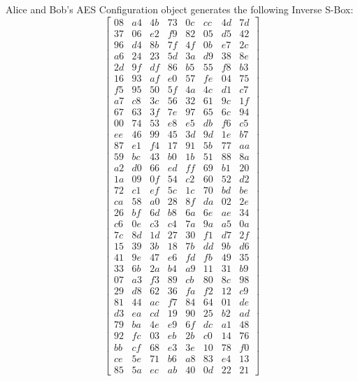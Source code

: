 \documentclass[journal]{IEEEtran}
\begin{document}
Alice and Bob's AES Configuration object generates the following Inverse S-Box:
$$
\begin{bmatrix} 
08 & a4 & 4b & 73 & 0c & cc & 4d & 7d \\
37 & 06 & e2 & f9 & 82 & 05 & d5 & 42 \\
96 & d4 & 8b & 7f & 4f & 0b & e7 & 2c \\
a6 & 24 & 23 & 5d & 3a & d9 & 38 & 8e \\
2d & 9f & df & 86 & b5 & 55 & f8 & b3 \\
16 & 93 & af & e0 & 57 & fe & 04 & 75 \\
f5 & 95 & 50 & 5f & 4a & 4c & d1 & c7 \\
a7 & c8 & 3c & 56 & 32 & 61 & 9c & 1f \\
67 & 63 & 3f & 7e & 97 & 65 & 6c & 94 \\
00 & 74 & 53 & e8 & e5 & db & f6 & c5 \\
ee & 46 & 99 & 45 & 3d & 9d & 1e & b7 \\
87 & e1 & f4 & 17 & 91 & 5b & 77 & aa \\
59 & bc & 43 & b0 & 1b & 51 & 88 & 8a \\
a2 & d0 & 66 & ed & ff & 69 & b1 & 20 \\
1a & 09 & 0f & 54 & c2 & 60 & 52 & d2 \\
72 & c1 & ef & 5c & 1c & 70 & bd & be \\
ca & 58 & a0 & 28 & 8f & da & 02 & 2e \\
26 & bf & 6d & b8 & 6a & 6e & ae & 34 \\
c6 & 0e & c3 & c4 & 7a & 9a & a5 & 0a \\
7c & 8d & 1d & 27 & 30 & f1 & d7 & 2f \\
15 & 39 & 3b & 18 & 7b & dd & 9b & d6 \\
41 & 9e & 47 & e6 & fd & fb & 49 & 35 \\
33 & 6b & 2a & b4 & a9 & 11 & 31 & b9 \\
07 & a3 & f3 & 89 & cb & 80 & 8c & 98 \\
29 & d8 & 62 & 36 & fa & f2 & 12 & c9 \\
81 & 44 & ac & f7 & 84 & 64 & 01 & de \\
d3 & ea & cd & 19 & 90 & 25 & b2 & ad \\
79 & ba & 4e & e9 & 6f & dc & a1 & 48 \\
92 & fc & 03 & eb & 2b & c0 & 14 & 76 \\
bb & cf & 68 & e3 & 3e & 10 & 78 & f0 \\
ce & 5e & 71 & b6 & a8 & 83 & e4 & 13 \\
85 & 5a & ec & ab & 40 & 0d & 22 & 21 
\end{bmatrix}
$$
\end{document}

